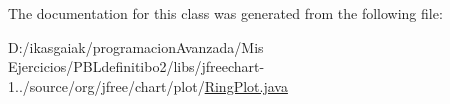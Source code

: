 The documentation for this class was generated from the following file\+:\begin{DoxyCompactItemize}
\item 
D\+:/ikasgaiak/programacion\+Avanzada/\+Mis Ejercicios/\+P\+B\+Ldefinitibo2/libs/jfreechart-\/1../source/org/jfree/chart/plot/\mbox{\hyperlink{_ring_plot_8java}{Ring\+Plot.\+java}}\end{DoxyCompactItemize}
